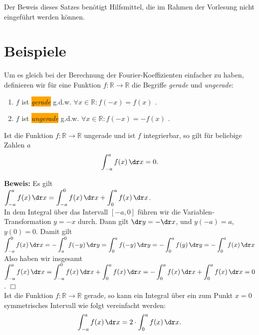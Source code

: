 \noindent
Der Beweis dieses Satzes ben\"otigt Hilfsmittel, die im Rahmen der Vorlesung
nicht eingef\"uhrt werden k\"onnen.

\section{Beispiele}
Um es gleich bei der Berechnung der Fourier-Koeffizienten einfacher zu haben, definieren
wir f\"ur eine Funktion $f:\mathbb{R} \rightarrow \mathbb{R}$ die Begriffe \emph{gerade}
und \emph{ungerade}: 
\begin{enumerate}
\item $f$ ist \colorbox{orange}{\emph{gerade}}   g.d.w. $\forall x\in\mathbb{R}: f(-x) =  f(x)$ .
\item $f$ ist \colorbox{orange}{\emph{ungerade}} g.d.w. $\forall x\in\mathbb{R}: f(-x) = -f(x)$ .
\end{enumerate}
Ist die Funktion $f:\mathbb{R} \rightarrow \mathbb{R}$ ungerade und ist $f$ integrierbar,
so gilt f\"ur beliebige Zahlen $a$ 
\begin{equation}
  \label{eq:intUngerade}
 \int_{-a}^a f(x)\,\dr x = 0.  
\end{equation}
\vspace*{0.3cm}

\noindent
\textbf{Beweis:} Es gilt 
\\[0.3cm]
\hspace*{1.3cm}
$\displaystyle \int_{-a}^a f(x)\,\dr x = \int_{-a}^0 f(x)\,\dr x + \int_{0}^a f(x)\,\dr x$.
\\[0.3cm]
In dem Integral \"uber das Intervall $[-a,0]$ f\"uhren wir die Variablen-Transformation $y =
-x$ durch.  Dann gilt $\dr y = - \dr x$, und $y(-a) = a$, $y(0) = 0$.  Damit gilt
\\[0.3cm]
\hspace*{1.3cm}
$
\displaystyle \int_{-a}^0 f(x)\,\dr x =  -\int_{a}^0 f(-y)\,\dr y  
  = \int_{0}^a f(-y)\,\dr y  
  = - \int_{0}^a f(y)\,\dr y  
  = - \int_{0}^a f(x)\,\dr x  
$
\\[0.3cm]
Also haben wir insgesamt
\\[0.3cm]
\hspace*{1.3cm}
$\displaystyle \int_{-a}^a f(x)\,\dr x = \int_{-a}^0 f(x)\,\dr x + \int_{0}^a f(x)\,\dr x
 = -\int_{0}^a f(x)\,\dr x + \int_{0}^a f(x)\,\dr x = 0$. \hspace*{\fill} $\Box$
\\[0.3cm]
Ist die Funktion $f:\mathbb{R} \rightarrow \mathbb{R}$ gerade, so kann ein Integral \"uber
ein zum Punkt $x=0$ symmetrisches Intervall wie folgt vereinfacht werden: 
\begin{equation}
  \label{eq:intGerade}
 \int_{-a}^a f(x)\,\dr x = 2 \cdot \int_{0}^a f(x)\,\dr x.  
\end{equation}
\vspace*{0.3cm}

